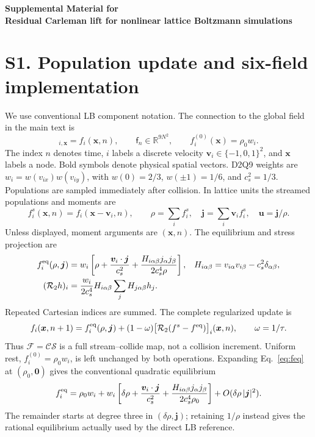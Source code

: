 \documentclass[10pt,letterpaper]{article}
\newcommand{\F}{\mathcal F}\newcommand{\B}{\mathcal B}
\newcommand{\fld}[1]{\mathsf{#1}}
\begin{document}
\begin{center}
{\large\bfseries Supplemental Material for\\[3pt] Residual Carleman lift for nonlinear lattice Boltzmann simulations}
\end{center}
\section*{S1. Population update and six-field implementation}
We use conventional LB component notation. The connection to the global field in the main text is
\begin{equation}
 [\fld f_n]_{i,\bm x}=f_i(\bm x,n),\qquad
 \fld f_n\in\mathbb R^{9N^2},\qquad f_i^{(0)}(\bm x)=\rho_0w_i.
\end{equation}
The index $n$ denotes time, $i$ labels a discrete velocity $\bm v_i\in\{-1,0,1\}^2$, and $\bm x$ labels a node. Bold symbols denote physical spatial vectors. D2Q9 weights are $w_i=w(v_{ix})w(v_{iy})$, with $w(0)=2/3$, $w(\pm1)=1/6$, and $c_s^2=1/3$. Populations are sampled immediately after collision. In lattice units the streamed populations and moments are
\begin{equation}
 f_i^s(\bm x,n)=f_i(\bm x-\bm v_i,n),\qquad
 \rho=\sum_i f_i^s,\quad \bm j=\sum_i\bm v_i f_i^s,\quad \bm u=\bm j/\rho.
 \label{eq:stream}
\end{equation}
Unless displayed, moment arguments are $(\bm x,n)$. The equilibrium and stress projection are
\begin{align}
 f_i^{\rm eq}(\rho,\bm j)&=w_i\left[\rho+\frac{\bm v_i\cdot\bm j}{c_s^2}
 +\frac{H_{i\alpha\beta}j_\alpha j_\beta}{2c_s^4\rho}\right],
 &H_{i\alpha\beta}&=v_{i\alpha}v_{i\beta}-c_s^2\delta_{\alpha\beta},\label{eq:feq}\\
 (\mathcal R_2h)_i&=\frac{w_i}{2c_s^4}H_{i\alpha\beta}\sum_jH_{j\alpha\beta}h_j.
 \label{eq:R2}
\end{align}
Repeated Cartesian indices are summed. The complete regularized update is
\begin{equation}
 f_i(\bm x,n+1)=f_i^{\rm eq}(\rho,\bm j)
 +(1-\omega)\big[\mathcal R_2(f^s-f^{\rm eq})\big]_i(\bm x,n),\qquad \omega=1/\tau.
 \label{eq:model}
\end{equation}
Thus $\F=\mathcal C\mathcal S$ is a full stream--collide map, not a collision increment. Uniform rest, $f_i^{(0)}=\rho_0w_i$, is left unchanged by both operations. Expanding Eq.~\eqref{eq:feq} at $(\rho_0,\bm0)$ gives the conventional quadratic equilibrium
\begin{equation}
 f_i^{\rm eq}=\rho_0w_i+w_i\left[\delta\rho+\frac{\bm v_i\cdot\bm j}{c_s^2}
 +\frac{H_{i\alpha\beta}j_\alpha j_\beta}{2c_s^4\rho_0}\right]
 +O(\delta\rho\,|\bm j|^2).
 \label{eq:restexpansion}
\end{equation}
The remainder starts at degree three in $(\delta\rho,\bm j)$; retaining $1/\rho$ instead gives the rational equilibrium actually used by the direct LB reference.
\end{document}
